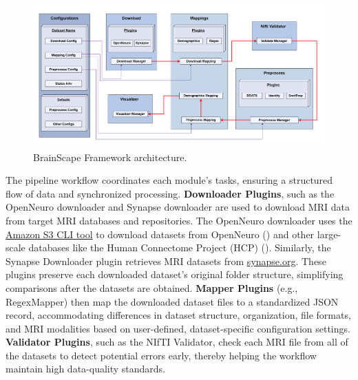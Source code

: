 \begin{figure}[htbp]\begin{center}\includegraphics[width=\linewidth]{figures/architecture.png}
    \caption{
        BrainScape Framework architecture.
    }
    \label{fig:SystemArchitecture}\end{center}
\end{figure}

The pipeline workflow coordinates each module's tasks, ensuring a structured flow of data and synchronized processing. 
\textbf{Downloader Plugins}, such as the OpenNeuro downloader and Synapse downloader are used to download MRI 
data from target MRI databases and repositories.
The OpenNeuro downloader uses the \href{https://docs.aws.amazon.com/cli/latest/reference/s3/}{Amazon S3 CLI tool} to download datasets 
from OpenNeuro (\cite{markiewicz2021openneuro}) and other large-scale databases like the Human Connectome Project (HCP) (\cite{van2013wu}).
Similarly, the Synapse Downloader plugin retrieves MRI datasets from \href{https://www.synapse.org}{synapse.org}.
These plugins preserve each downloaded dataset's original folder structure, simplifying comparisons after the datasets are obtained.
\textbf{Mapper Plugins} (e.g., RegexMapper) then map the downloaded dataset files to a standardized JSON record, 
accommodating differences in dataset structure, organization, file formats, and MRI modalities based on user-defined, 
dataset-specific configuration settings.
\textbf{Validator Plugins}, such as the NIfTI Validator, check each MRI file from all of the datasets 
to detect potential errors early, thereby helping the workflow maintain high data-quality standards.

